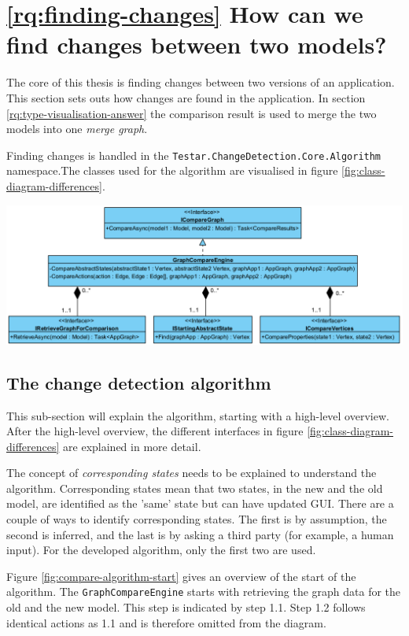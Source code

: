 \section{\ref{rq:finding-changes} How can we find changes between two models?} \label{sec:finding-changes}

The core of this thesis is finding changes between two versions of an application. This section sets outs how changes are found in the application. In section \ref{rq:type-visualisation-answer} the comparison result is used to merge the two models into one \textit{merge graph}.

Finding changes is handled in the \verb|Testar.ChangeDetection.Core.Algorithm| namespace.The classes used for the algorithm are visualised in figure \ref{fig:class-diagram-differences}. 

\begingroup
\captionsetup{type=figure}
\includegraphics[scale=0.65]{images/4-UML-Differences.png}
\label{fig:class-diagram-differences}
\endgroup

\subsection{The change detection algorithm} \label{sec:change-detection-algorithm}
This sub-section will explain the algorithm, starting with a high-level overview. After the high-level overview, the different interfaces in figure \ref{fig:class-diagram-differences} are explained in more detail.

The concept of \textit{corresponding states} needs to be explained to understand the algorithm. Corresponding states mean that two states, in the new and the old model, are identified as the 'same' state but can have updated GUI. There are a couple of ways to identify corresponding states. The first is by assumption, the second is inferred, and the last is by asking a third party (for example, a human input). For the developed algorithm, only the first two are used. 

Figure \ref{fig:compare-algorithm-start} gives an overview of the start of the algorithm. The \verb|GraphCompareEngine| starts with retrieving the graph data for the old and the new model. This step is indicated by step 1.1. Step 1.2 follows identical actions as 1.1 and is therefore omitted from the diagram.
\newpage


